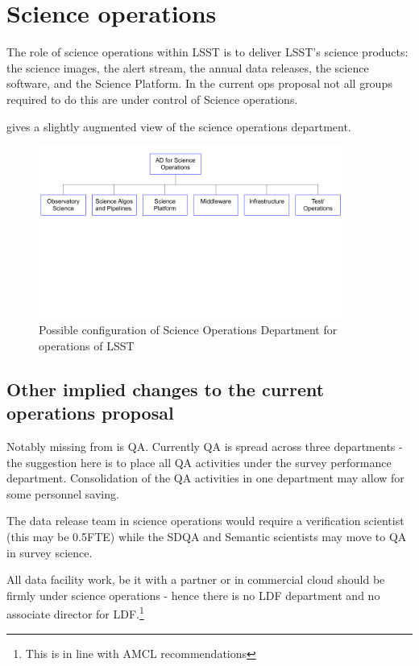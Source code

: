 
\section{Science operations}\label{sec:sciops}

The role of science operations within \gls{LSST} is to deliver \gls{LSST}'s science products: the science images, the alert stream, the annual data releases, the science \gls{software}, and the Science Platform. In the current ops proposal not all groups required to do this are under control of Science operations.

 gives a slightly augmented view of the science operations department.

\begin{figure}
\includegraphics[width=0.9\textwidth]{figures/OrgOpsChart}
\caption{Possible configuration of Science Operations Department for operations of \gls{LSST} \label{fig:org}}
\end{figure}


\subsection{Other implied changes to the current operations proposal}
Notably missing from  is \gls{QA}. Currently \gls{QA} is spread across  three
 departments - the suggestion here is to place all \gls{QA} activities under the survey performance department. Consolidation
of the \gls{QA} activities in one department may allow for some personnel saving.

The data release team in science operations would require a verification scientist (this may be 0.5FTE) while the \gls{SDQA} and Semantic scientists may move to QA in survey science.

All data facility work, be it with a partner or in commercial \gls{cloud} should be firmly under science operations - hence there is no LDF department and no associate director for LDF.\footnote{This is  in line with AMCL recommendations}

